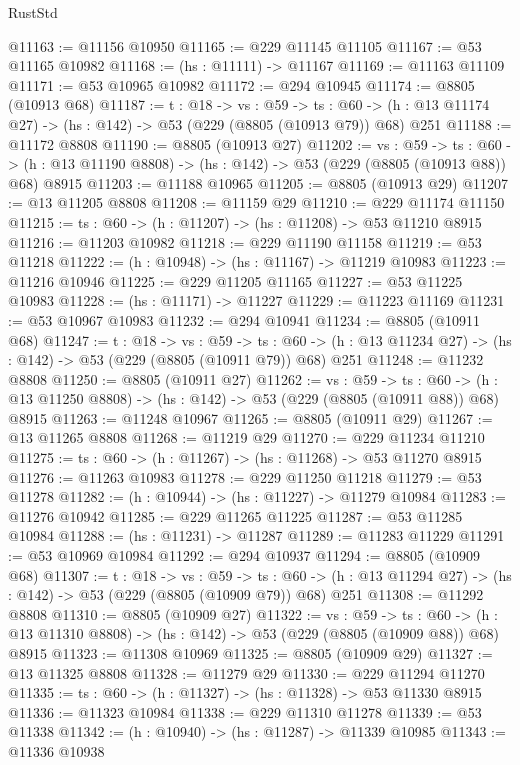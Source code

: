 \begin{lexlean}{RustStd}
\begin{coremodule}
@11163 := @11156 @10950
@11165 := @229 @11145 @11105
@11167 := @53 @11165 @10982
@11168 := (hs : @11111) -> @11167
@11169 := @11163 @11109
@11171 := @53 @10965 @10982
@11172 := @294 @10945
@11174 := @8805 (@10913 @68)
@11187 := {t : @18} ->
  {vs : @59} ->
  {ts : @60} -> (h : @13 @11174 @27) -> (hs : @142) -> @53 (@229 (@8805 (@10913 @79)) @68) @251
@11188 := @11172 @8808
@11190 := @8805 (@10913 @27)
@11202 := {vs : @59} ->
  {ts : @60} -> (h : @13 @11190 @8808) -> (hs : @142) -> @53 (@229 (@8805 (@10913 @88)) @68) @8915
@11203 := @11188 @10965
@11205 := @8805 (@10913 @29)
@11207 := @13 @11205 @8808
@11208 := @11159 @29
@11210 := @229 @11174 @11150
@11215 := {ts : @60} -> (h : @11207) -> (hs : @11208) -> @53 @11210 @8915
@11216 := @11203 @10982
@11218 := @229 @11190 @11158
@11219 := @53 @11218
@11222 := (h : @10948) -> (hs : @11167) -> @11219 @10983
@11223 := @11216 @10946
@11225 := @229 @11205 @11165
@11227 := @53 @11225 @10983
@11228 := (hs : @11171) -> @11227
@11229 := @11223 @11169
@11231 := @53 @10967 @10983
@11232 := @294 @10941
@11234 := @8805 (@10911 @68)
@11247 := {t : @18} ->
  {vs : @59} ->
  {ts : @60} -> (h : @13 @11234 @27) -> (hs : @142) -> @53 (@229 (@8805 (@10911 @79)) @68) @251
@11248 := @11232 @8808
@11250 := @8805 (@10911 @27)
@11262 := {vs : @59} ->
  {ts : @60} -> (h : @13 @11250 @8808) -> (hs : @142) -> @53 (@229 (@8805 (@10911 @88)) @68) @8915
@11263 := @11248 @10967
@11265 := @8805 (@10911 @29)
@11267 := @13 @11265 @8808
@11268 := @11219 @29
@11270 := @229 @11234 @11210
@11275 := {ts : @60} -> (h : @11267) -> (hs : @11268) -> @53 @11270 @8915
@11276 := @11263 @10983
@11278 := @229 @11250 @11218
@11279 := @53 @11278
@11282 := (h : @10944) -> (hs : @11227) -> @11279 @10984
@11283 := @11276 @10942
@11285 := @229 @11265 @11225
@11287 := @53 @11285 @10984
@11288 := (hs : @11231) -> @11287
@11289 := @11283 @11229
@11291 := @53 @10969 @10984
@11292 := @294 @10937
@11294 := @8805 (@10909 @68)
@11307 := {t : @18} ->
  {vs : @59} ->
  {ts : @60} -> (h : @13 @11294 @27) -> (hs : @142) -> @53 (@229 (@8805 (@10909 @79)) @68) @251
@11308 := @11292 @8808
@11310 := @8805 (@10909 @27)
@11322 := {vs : @59} ->
  {ts : @60} -> (h : @13 @11310 @8808) -> (hs : @142) -> @53 (@229 (@8805 (@10909 @88)) @68) @8915
@11323 := @11308 @10969
@11325 := @8805 (@10909 @29)
@11327 := @13 @11325 @8808
@11328 := @11279 @29
@11330 := @229 @11294 @11270
@11335 := {ts : @60} -> (h : @11327) -> (hs : @11328) -> @53 @11330 @8915
@11336 := @11323 @10984
@11338 := @229 @11310 @11278
@11339 := @53 @11338
@11342 := (h : @10940) -> (hs : @11287) -> @11339 @10985
@11343 := @11336 @10938

\end{coremodule}
\end{lexlean}
